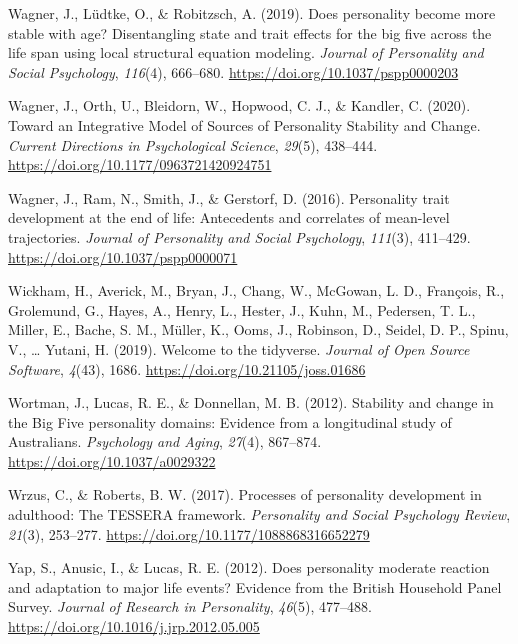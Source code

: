 \documentclass[
  english,
  man, noextraspace]{apa7}
\begin{document}
\leavevmode\hypertarget{ref-wagnerDoesPersonalityBecome2019}{}%
Wagner, J., Lüdtke, O., \& Robitzsch, A. (2019). Does personality become more stable with age? Disentangling state and trait effects for the big five across the life span using local structural equation modeling. \emph{Journal of Personality and Social Psychology}, \emph{116}(4), 666--680. \url{https://doi.org/10.1037/pspp0000203}

\leavevmode\hypertarget{ref-wagnerIntegrativeModelSources2020}{}%
Wagner, J., Orth, U., Bleidorn, W., Hopwood, C. J., \& Kandler, C. (2020). Toward an Integrative Model of Sources of Personality Stability and Change. \emph{Current Directions in Psychological Science}, \emph{29}(5), 438--444. \url{https://doi.org/10.1177/0963721420924751}

\leavevmode\hypertarget{ref-wagnerPersonalityTraitDevelopment2016}{}%
Wagner, J., Ram, N., Smith, J., \& Gerstorf, D. (2016). Personality trait development at the end of life: Antecedents and correlates of mean-level trajectories. \emph{Journal of Personality and Social Psychology}, \emph{111}(3), 411--429. \url{https://doi.org/10.1037/pspp0000071}

\leavevmode\hypertarget{ref-tidyverse2019}{}%
Wickham, H., Averick, M., Bryan, J., Chang, W., McGowan, L. D., François, R., Grolemund, G., Hayes, A., Henry, L., Hester, J., Kuhn, M., Pedersen, T. L., Miller, E., Bache, S. M., Müller, K., Ooms, J., Robinson, D., Seidel, D. P., Spinu, V., \ldots{} Yutani, H. (2019). Welcome to the tidyverse. \emph{Journal of Open Source Software}, \emph{4}(43), 1686. \url{https://doi.org/10.21105/joss.01686}

\leavevmode\hypertarget{ref-wortmanStabilityChangeBig2012}{}%
Wortman, J., Lucas, R. E., \& Donnellan, M. B. (2012). Stability and change in the Big Five personality domains: Evidence from a longitudinal study of Australians. \emph{Psychology and Aging}, \emph{27}(4), 867--874. \url{https://doi.org/10.1037/a0029322}

\leavevmode\hypertarget{ref-wrzusProcessesPersonalityDevelopment2017}{}%
Wrzus, C., \& Roberts, B. W. (2017). Processes of personality development in adulthood: The TESSERA framework. \emph{Personality and Social Psychology Review}, \emph{21}(3), 253--277. \url{https://doi.org/10.1177/1088868316652279}

\leavevmode\hypertarget{ref-yapDoesPersonalityModerate2012}{}%
Yap, S., Anusic, I., \& Lucas, R. E. (2012). Does personality moderate reaction and adaptation to major life events? Evidence from the British Household Panel Survey. \emph{Journal of Research in Personality}, \emph{46}(5), 477--488. \url{https://doi.org/10.1016/j.jrp.2012.05.005}
\end{document}
